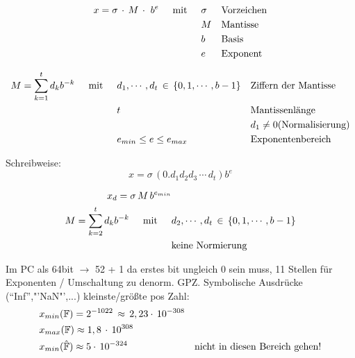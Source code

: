 \begin{align*}
x = \sigma\,\cdot\,M\,\cdot\,\,b^e \hspace{0.5cm} \text{mit} \hspace{0.5cm} & \sigma && \text{Vorzeichen}\\
& M && \text{Mantisse} \\
& b && \text{Basis} \\
& e && \text{Exponent}
\end{align*}

\begin{align*}
M = \sum^t_{k=1} d_k b^{-k} \hspace{0.5cm} \text{mit} \hspace{0.5cm} & d_1,\cdots,d_t\, \in\,\{0,1,\cdots,b-1\} && \text{Ziffern der Mantisse}\\
& t && \text{Mantissenlänge} \\
& && d_1 \neq 0 \text{(Normalisierung)} \\
& e_{min} \leq e \leq e_{max} && \text{Exponentenbereich}
\end{align*}

Schreibweise:
\begin{equation*}
x = \sigma\,(0.d_1d_2d_3\,\cdots\,d_t)b^e
\end{equation*}


\begin{align*}
x_d = \sigma\,M\,b^{e_{min}} &\\
M = \sum^t_{k=2} d_k b^{-k} \hspace{0.5cm} \text{mit} \hspace{0.5cm} & d_2,\cdots,d_t\, \in\,\{0,1,\cdots,b-1\} \\
& \text{keine Normierung} 
\end{align*}



 Im PC als 64bit $\rightarrow$ 52 + 1 da erstes bit ungleich 0 sein muss, 11 Stellen für Exponenten / Umschaltung zu denorm. GPZ. Symbolische Ausdrücke ("`Inf"',"'NaN"',...) 
kleinste/größte pos Zahl:
\begin{align*}
	& x_{min}(\mathbb{F}) =  2^{-1022}\,\approx\, 2,23\cdot\,10^{-308} \\
	& x_{max}(\mathbb{F}) \approx 1,8\,\cdot\,10^{308} \\
  & x_{min}(\hat{\mathbb{F}}) \approx 5\cdot\,10^{-324} & \text{nicht in diesen Bereich gehen!}
\end{align*}


